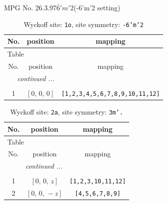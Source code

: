 \documentclass[fleqn,8pt]{jsarticle}
\begin{document}
\setcounter{MaxMatrixCols}{32}

\renewcommand{\tablename}{Table~}
\renewcommand{\figurename}{Figure~}
\begin{center}
\LARGE
MPG No. 26.3.97\quad$\bar{6}'m'2$\quad(-6'm'2 setting)
\end{center}
\renewcommand{\arraystretch}{1.2}
\begin{longtable}{ccc}
\caption{Wyckoff site: {\tt 1o}, site symmetry: {\tt -6'm'2}}
 \\
 \hline \hline
No. & position & mapping \\ \hline \endfirsthead

\multicolumn{2}{l}{\tablename\ \thetable{}} \\
 \hline \hline
No. & position & mapping \\ \hline \endhead

 \hline \hline
\multicolumn{2}{r}{\footnotesize\it continued ...} \\ \endfoot

 \hline \hline
\multicolumn{2}{r}{} \\ \endlastfoot

1 & $\left[ 0,\, 0,\, 0 \right]$ & {\tt [1,2,3,4,5,6,7,8,9,10,11,12]} \\
\end{longtable}
\renewcommand{\arraystretch}{1.2}
\begin{longtable}{ccc}
\caption{Wyckoff site: {\tt 2a}, site symmetry: {\tt 3m'.}}
 \\
 \hline \hline
No. & position & mapping \\ \hline \endfirsthead

\multicolumn{2}{l}{\tablename\ \thetable{}} \\
 \hline \hline
No. & position & mapping \\ \hline \endhead

 \hline \hline
\multicolumn{2}{r}{\footnotesize\it continued ...} \\ \endfoot

 \hline \hline
\multicolumn{2}{r}{} \\ \endlastfoot

1 & $\left[ 0,\, 0,\, z \right]$ & {\tt [1,2,3,10,11,12]} \\ \hline
2 & $\left[ 0,\, 0,\, - z \right]$ & {\tt [4,5,6,7,8,9]} \\
\end{longtable}
\renewcommand{\arraystretch}{1.2}
\end{document}
